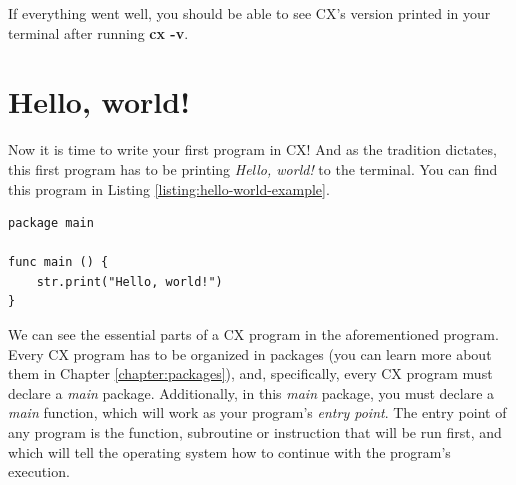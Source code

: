 \documentclass[11pt,fleqn,openany]{book} %
\begin{document}
If everything went well, you should be able to see CX's version printed in your terminal after running \textbf{cx -v}.

\section{Hello, world!}
\label{subsection:hello-world}


Now it is time to write your first program in CX! And as the tradition dictates, this first program has to be printing \emph{Hello, world!} to the terminal. You can find this program in Listing \ref{listing:hello-world-example}.

\begin{lstlisting}[caption={"Hello, world!" Example},captionpos=b,label={listing:hello-world-example}]
package main

func main () {
 	str.print("Hello, world!")
}
\end{lstlisting}

We can see the essential parts of a CX program in the aforementioned program. Every CX program has to be organized in packages (you can learn more about them in Chapter \ref{chapter:packages}), and, specifically, every CX program must declare a \emph{main} package. Additionally, in this \emph{main} package, you must declare a \emph{main} function, which will work as your program's \emph{entry point}. The entry point of any program is the function, subroutine or instruction that will be run first, and which will tell the operating system how to continue with the program's execution.
\end{document}
